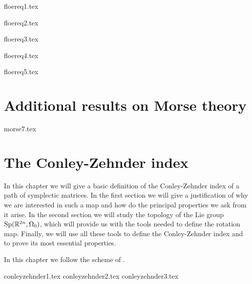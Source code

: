 \documentclass[a4paper,11pt]{book}
\begin{document}
 {floereq1.tex}

 {floereq2.tex}

 {floereq3.tex}

 {floereq4.tex}

 {floereq5.tex}


\begin{appendices}
\chapter{Additional results on Morse theory}
{morse7.tex}

\chapter{The Conley-Zehnder index}

In this chapter we will give a basic definition of the Conley-Zehnder index of a path of symplectic matrices. In the first section we will give a justification of why we are interested in such a map and how do the principal properties we ask from it arise. In the second section we will study the topology of the Lie group $\mathrm{Sp}(\mathbb{R}^{2n},\Omega_0)$, which will provide us with the tools needed to define the rotation map. Finally, we will use all these tools to define the Conley-Zehnder index and to prove its most essential properties.

In this chapter we follow the scheme of \cite{gutt2012conley}.

{conleyzehnder1.tex}
{conleyzehnder2.tex}
{conleyzehnder3.tex}
\end{appendices}



\end{document}
